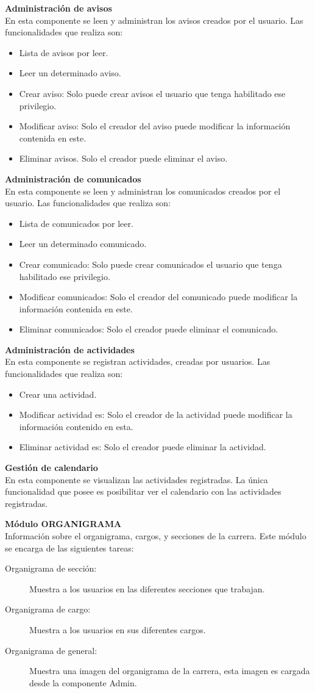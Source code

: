 \documentclass[10pt,letterpaper,twoside]{article}
\newcommand{\btext}[1]{
    \vspace{10mm}
    {{\textcolor{titlecolor}{\large{\textbf{\textsf{#1}}}}}}
    \vspace{5mm}
    \\
}
\newcommand{\ctext}[1]{
    \vspace{5mm}
    {{\textcolor{titlecolor}{\large{\textbf{\textsf{#1}}}}}}
    \\
}
\begin{document}
\begin{multicols}{2}
\ctext{Administración de avisos}
En esta componente se leen y administran los avisos creados por el usuario.
Las funcionalidades que realiza son:
\begin{itemize}
    \item Lista de avisos por leer.
    \item Leer un determinado aviso.
    \item Crear aviso: Solo puede crear avisos el usuario que tenga habilitado ese privilegio.
    \item Modificar aviso: Solo el creador del aviso puede modificar la información contenida en este.
    \item Eliminar avisos. Solo el creador puede eliminar el aviso.
\end{itemize}

\ctext{Administración de comunicados}
En esta componente se leen y administran los comunicados creados por el usuario.
Las funcionalidades que realiza son:
\begin{itemize}
    \item Lista de comunicados por leer.
    \item Leer un determinado comunicado.
    \item Crear comunicado: Solo puede crear comunicados el usuario que tenga habilitado ese privilegio.
    \item Modificar comunicados: Solo el creador del comunicado puede modificar la información contenida en este.
    \item Eliminar comunicados: Solo el creador puede eliminar el comunicado.
\end{itemize}

\ctext{Administración de actividades}
En esta componente se registran actividades, creadas por usuarios.
Las funcionalidades que realiza son:
\begin{itemize}
    \item Crear una actividad.
    \item Modificar actividad es: Solo el creador de la actividad puede modificar la información contenido en esta.
    \item Eliminar actividad es: Solo el creador puede eliminar la actividad.
\end{itemize}

\ctext{Gestión de calendario}
En esta componente se visualizan las actividades registradas.
La única funcionalidad que posee es posibilitar ver el calendario con las actividades registradas.

\btext{Módulo ORGANIGRAMA}
Información sobre el organigrama, cargos, y secciones de la carrera.
Este módulo se encarga de las siguientes tareas:
\begin{description}
    \item [Organigrama de sección:] Muestra a los usuarios en las diferentes secciones que trabajan.
    \item [Organigrama de cargo:] Muestra a los usuarios en sus diferentes cargos.
    \item [Organigrama de general:] Muestra una imagen del organigrama de la carrera, esta imagen es cargada desde la componente Admin.
\end{description}


\end{multicols}
\end{document}
